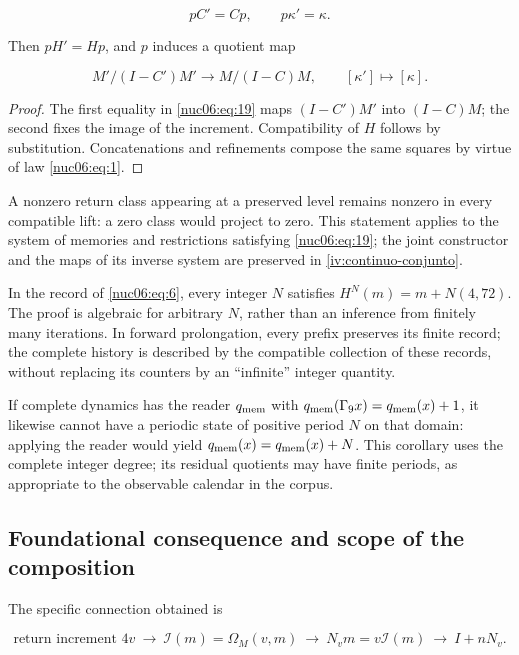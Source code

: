 \begin{equation}
pC'=Cp,\qquad p\kappa'=\kappa.
\label{nuc06:eq:19}
\end{equation}

Then \(pH'=Hp\), and \(p\) induces a quotient map

\begin{equation}
M'/(I-C')M'\longrightarrow M/(I-C)M,
\qquad [\kappa']\longmapsto[\kappa].
\label{nuc06:eq:20}
\end{equation}

\begin{proof}
The first equality in \eqref{nuc06:eq:19} maps \((I-C')M'\) into \((I-C)M\); the second fixes the image of the increment. Compatibility of \(H\) follows by substitution. Concatenations and refinements compose the same squares by virtue of law \eqref{nuc06:eq:1}.
\end{proof}

A nonzero return class appearing at a preserved level remains nonzero in every compatible lift: a zero class would project to zero. This statement applies to the system of memories and restrictions satisfying \eqref{nuc06:eq:19}; the joint constructor and the maps of its inverse system are preserved in \cref{iv:continuo-conjunto}.

In the record of \eqref{nuc06:eq:6}, every integer \(N\) satisfies \(H^N(m)=m+N(4,72)\). The proof is algebraic for arbitrary \(N\), rather than an inference from finitely many iterations. In forward prolongation, every prefix preserves its finite record; the complete history is described by the compatible collection of these records, without replacing its counters by an ``infinite'' integer quantity.

If complete dynamics has the reader \(q_{\rm mem}\) with \(q_{\rm mem}(\Gamma_9x)=q_{\rm mem}(x)+1\), it likewise cannot have a periodic state of positive period \(N\) on that domain: applying the reader would yield \(q_{\rm mem}(x)=q_{\rm mem}(x)+N\). This corollary uses the complete integer degree; its residual quotients may have finite periods, as appropriate to the observable calendar in the corpus.

\subsection{Foundational consequence and scope of the composition}

The specific connection obtained is

\begin{equation}
\text{return increment }4v
\ \longrightarrow\ \mathcal I(m)=\Omega_M(v,m)
\ \longrightarrow\ N_vm=v\mathcal I(m)
\ \longrightarrow\ I+nN_v.
\label{nuc06:eq:21}
\end{equation}

